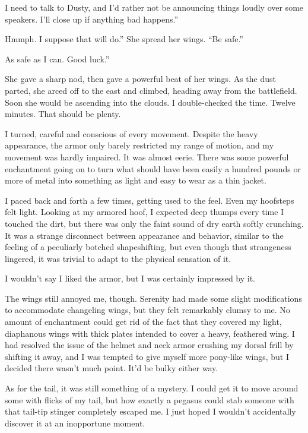 \leavevmode{}I need to talk to Dusty, and I’d rather not be announcing things loudly over some speakers. I’ll close up if anything bad happens.”

\leavevmode{}Hmmph. I suppose that will do.” She spread her wings. “Be safe.”

\leavevmode{}As safe as I can. Good luck.”

She gave a sharp nod, then gave a powerful beat of her wings. As the dust parted, she arced off to the east and climbed, heading away from the battlefield. Soon she would be ascending into the clouds. I double-checked the time. Twelve minutes. That should be plenty.

I turned, careful and conscious of every movement. Despite the heavy appearance, the armor only barely restricted my range of motion, and my movement was hardly impaired. It was almost eerie. There was some powerful enchantment going on to turn what should have been easily a hundred pounds or more of metal into something as light and easy to wear as a thin jacket.

I paced back and forth a few times, getting used to the feel. Even my hoofsteps felt light. Looking at my armored hoof, I expected deep thumps every time I touched the dirt, but there was only the faint sound of dry earth softly crunching. It was a strange disconnect between appearance and behavior, similar to the feeling of a peculiarly botched shapeshifting, but even though that strangeness lingered, it was trivial to adapt to the physical sensation of it.

I wouldn’t say I liked the armor, but I was certainly impressed by it.

The wings still annoyed me, though. Serenity had made some slight modifications to accommodate changeling wings, but they felt remarkably clumsy to me. No amount of enchantment could get rid of the fact that they covered my light, diaphanous wings with thick plates intended to cover a heavy, feathered wing. I had resolved the issue of the helmet and neck armor crushing my dorsal frill by shifting it away, and I was tempted to give myself more pony-like wings, but I decided there wasn’t much point. It’d be bulky either way.

As for the tail, it was still something of a mystery. I could get it to move around some with flicks of my tail, but how exactly a pegasus could stab someone with that tail-tip stinger completely escaped me. I just hoped I wouldn’t accidentally discover it at an inopportune moment.

